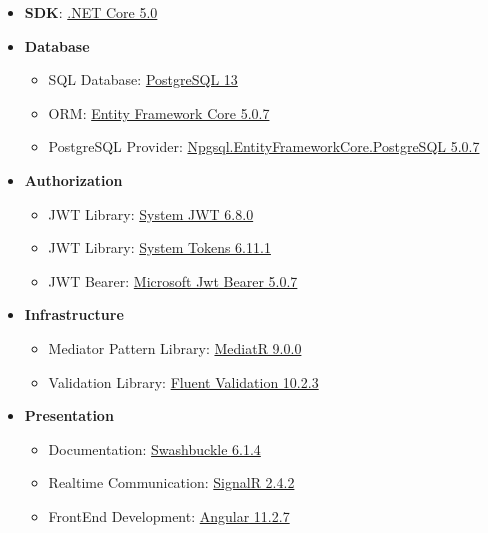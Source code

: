 \begin{itemize}
    \item \textbf{SDK}: \href{https://dotnet.microsoft.com/download/dotnet/5.0}{.NET Core 5.0}
    \item \textbf{Database}
    \begin{itemize}
        \item SQL Database: \href{https://www.postgresql.org/}{PostgreSQL 13}
        \item ORM: \href{https://www.nuget.org/packages/Microsoft.EntityFrameworkCore/5.0.7?_src=template}{Entity Framework Core 5.0.7}
        \item PostgreSQL Provider: \href{https://www.nuget.org/packages/Npgsql.EntityFrameworkCore.PostgreSQL/5.0.7?_src=template}{Npgsql.EntityFrameworkCore.PostgreSQL 5.0.7}
    \end{itemize}
    \item \textbf{Authorization}
    \begin{itemize}
        \item JWT Library: \href{https://www.nuget.org/packages/System.IdentityModel.Tokens.Jwt}{System JWT 6.8.0}
        \item JWT Library: \href{https://www.nuget.org/packages/System.IdentityModel.Tokens}{System Tokens 6.11.1}
        \item JWT Bearer: \href{https://www.nuget.org/packages/Microsoft.AspNetCore.Authentication.JwtBearer/5.0.7?_src=template}{Microsoft Jwt Bearer 5.0.7}
    \end{itemize}
    \item \textbf{Infrastructure}
    \begin{itemize}
        \item Mediator Pattern Library: \href{https://www.nuget.org/packages/MediatR/9.0.0?_src=template}{MediatR 9.0.0}
        \item Validation Library: \href{https://www.nuget.org/packages/FluentValidation/10.2.3?_src=template}{Fluent Validation 10.2.3}
    \end{itemize}
    \item \textbf{Presentation}
    \begin{itemize}
        \item Documentation: \href{https://www.nuget.org/packages/Swashbuckle.AspNetCore/5.6.3?_src=template}{Swashbuckle 6.1.4}
        \item Realtime Communication: \href{https://www.nuget.org/packages/Microsoft.AspNet.SignalR/}{SignalR 2.4.2}
        \item FrontEnd Development: \href{https://angular.io/guide/setup-local}{Angular 11.2.7}

\end{itemize}
\end{itemize}

